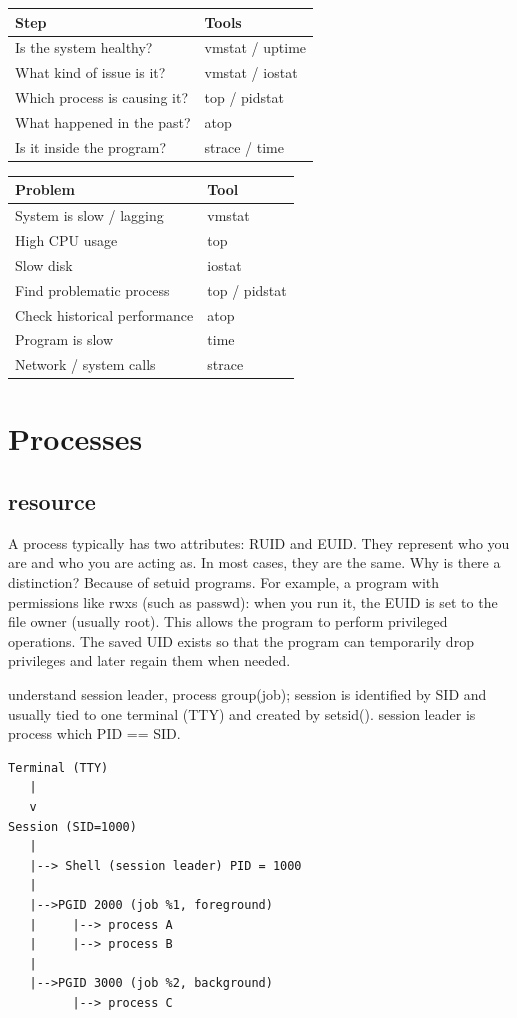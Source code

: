 \documentclass[paper=8.5in:11in, twoside, 12pt, pagesize=pdftex]{book}
\begin{document}
\begin{tabular}{|l|l|}
\hline
\textbf{Step} & \textbf{Tools} \\
\hline
Is the system healthy? & vmstat / uptime \\
\hline
What kind of issue is it? & vmstat / iostat \\
\hline
Which process is causing it? & top / pidstat \\
\hline
What happened in the past? & atop \\
\hline
Is it inside the program? & strace / time \\
\hline
\end{tabular}

\begin{tabular}{|l|l|}
\hline
\textbf{Problem} & \textbf{Tool} \\
\hline
System is slow / lagging & vmstat \\
\hline
High CPU usage & top \\
\hline
Slow disk & iostat \\
\hline
Find problematic process & top / pidstat \\
\hline
Check historical performance & atop \\
\hline
Program is slow & time \\
\hline
Network / system calls & strace \\
\hline
\end{tabular}



\section{Processes}
\subsection{resource}

	\par A process typically has two attributes: RUID and EUID. They represent who you are and who you are acting as. In most cases, they are the same. Why is there a distinction? Because of setuid programs. For example, a program with permissions like rwxs (such as passwd): when you run it, the EUID is set to the file owner (usually root). This allows the program to perform privileged operations. The saved UID exists so that the program can temporarily drop privileges and later regain them when needed.

	\par understand session leader, process group(job); session is identified by SID and usually tied to one terminal (TTY) and created by setsid(). session leader is process which PID == SID. 
\begin{lstlisting}
Terminal (TTY)
   |
   v
Session (SID=1000)
   |
   |--> Shell (session leader) PID = 1000
   |
   |-->PGID 2000 (job %1, foreground)
   |     |--> process A
   |     |--> process B
   |
   |-->PGID 3000 (job %2, background)
         |--> process C
\end{lstlisting}
\end{document}
